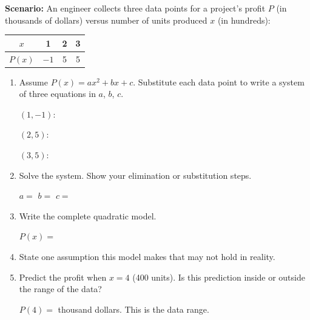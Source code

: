 \documentclass[10pt]{article}
\begin{document}
\vspace{0.08in}

\begin{tcolorbox}[colback=white, colframe=black!40,
    title=\textbf{Tier E --- Extend},
    fonttitle=\bfseries, arc=2mm, left=3mm, right=3mm, top=2mm, bottom=2mm]

\textbf{Scenario:} An engineer collects three data points for a project's profit $P$
(in thousands of dollars) versus number of units produced $x$ (in hundreds):

\medskip
\renewcommand{\arraystretch}{1.3}
\begin{tabular}{|c|c|c|c|}
\hline
$x$ & 1 & 2 & 3 \\
\hline
$P(x)$ & $-1$ & 5 & 5 \\
\hline
\end{tabular}

\begin{enumerate}[itemsep=10pt]
  \item Assume $P(x) = ax^2 + bx + c$. Substitute each data point to write a system
        of three equations in $a$, $b$, $c$.

        \vspace{0.06in}
        $(1,-1)$: \blank{7cm}

        \vspace{0.04in}
        $(2, 5)$: \blank{7cm}

        \vspace{0.04in}
        $(3, 5)$: \blank{7cm}

  \item Solve the system. Show your elimination or substitution steps.

        \vspace{0.08in}

        $a = $ \blank{2cm} \quad $b = $ \blank{2cm} \quad $c = $ \blank{2cm}

  \item Write the complete quadratic model.

        \vspace{0.06in}
        $P(x) = $ \blank{7cm}

  \item State one assumption this model makes that may not hold in reality.

        \vspace{0.06in}
        \writeline

  \item Predict the profit when $x = 4$ (400 units). Is this prediction inside or outside
        the range of the data?

        \vspace{0.06in}
        $P(4) = $ \blank{5cm} thousand dollars. This is \blank{3cm} the data range.
\end{enumerate}
\end{tcolorbox}
\end{document}
